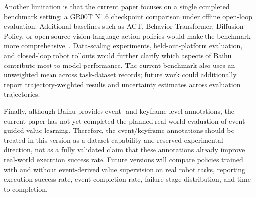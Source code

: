 Another limitation is that the current paper focuses on a single completed benchmark setting: a GR00T N1.6 checkpoint comparison under offline open-loop evaluation. Additional baselines such as ACT, Behavior Transformer, Diffusion Policy, or open-source vision-language-action policies would make the benchmark more comprehensive~\cite{zhao2023aloha,shafiullah2022behaviortransformer,chi2023diffusionpolicy,kim2024openvla}. Data-scaling experiments, held-out-platform evaluation, and closed-loop robot rollouts would further clarify which aspects of Baihu contribute most to model performance. The current benchmark also uses an unweighted mean across task-dataset records; future work could additionally report trajectory-weighted results and uncertainty estimates across evaluation trajectories.

Finally, although Baihu provides event- and keyframe-level annotations, the current paper has not yet completed the planned real-world evaluation of event-guided value learning. Therefore, the event/keyframe annotations should be treated in this version as a dataset capability and reserved experimental direction, not as a fully validated claim that these annotations already improve real-world execution success rate. Future versions will compare policies trained with and without event-derived value supervision on real robot tasks, reporting execution success rate, event completion rate, failure stage distribution, and time to completion.
